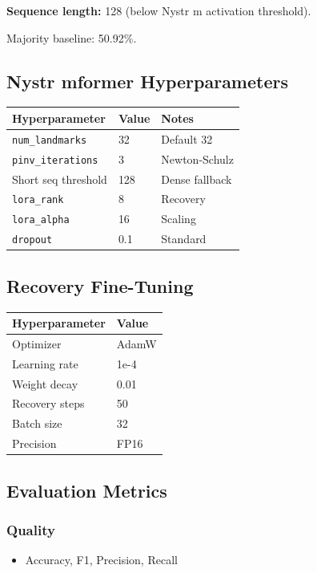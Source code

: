 \textbf{Sequence length:} 128 (below Nystr m activation threshold).

Majority baseline: 50.92\%.

\subsection{Nystr mformer Hyperparameters}

\begin{table}[H]
\centering
\small
\begin{tabular}{lll}
\toprule
\textbf{Hyperparameter} & \textbf{Value} & \textbf{Notes} \\
\midrule
\texttt{num\_landmarks} & 32 & Default 32 \\
\texttt{pinv\_iterations} & 3 & Newton-Schulz \\
Short seq threshold & 128 & Dense fallback \\
\texttt{lora\_rank} & 8 & Recovery \\
\texttt{lora\_alpha} & 16 & Scaling \\
\texttt{dropout} & 0.1 & Standard \\
\bottomrule
\end{tabular}
\end{table}

\subsection{Recovery Fine-Tuning}

\begin{table}[H]
\centering
\small
\begin{tabular}{ll}
\toprule
\textbf{Hyperparameter} & \textbf{Value} \\
\midrule
Optimizer & AdamW \\
Learning rate & 1e-4 \\
Weight decay & 0.01 \\
Recovery steps & 50 \\
Batch size & 32 \\
Precision & FP16 \\
\bottomrule
\end{tabular}
\end{table}

\subsection{Evaluation Metrics}

\subsubsection{Quality}
\begin{itemize}
\item Accuracy, F1, Precision, Recall

\end{itemize}
